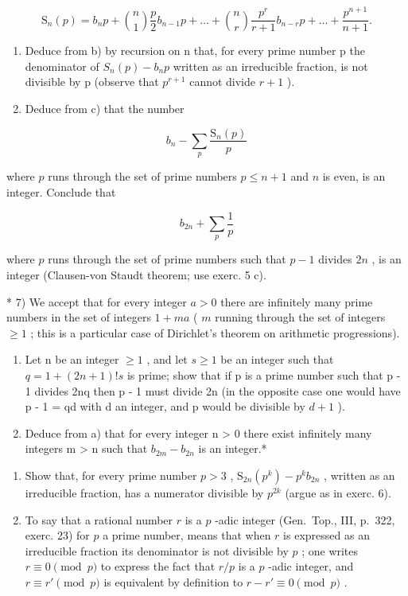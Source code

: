 \[
\mathrm{S} _ {n} (p) = b _ {n} p + \binom {n} {1} \frac {p}{2} b _ {n - 1} p + \dots + \binom {n} {r} \frac {p ^ {r}}{r + 1} b _ {n - r} p + \dots + \frac {p ^ {n + 1}}{n + 1}.
\]

\begin{enumerate}
\def\labelenumi{\alph{enumi})}
\setcounter{enumi}{2}
\item
  Deduce from b) by recursion on n that, for every prime number p the denominator of \(S_{n}(p) - b_{n}p\) written as an irreducible fraction, is not divisible by p (observe that \(p^{r+1}\) cannot divide \(r + 1\) ).
\item
  Deduce from c) that the number
\end{enumerate}

\[
b _ {n} - \sum_ {p} \frac {\mathrm{S} _ {n} (p)}{p}
\]

where \(p\) runs through the set of prime numbers \(p \leqslant n + 1\) and \(n\) is even, is an integer. Conclude that

\[
b _ {2 n} + \sum_ {p} \frac {1}{p}
\]

where \(p\) runs through the set of prime numbers such that \(p - 1\) divides \(2n\) , is an integer (Clausen-von Staudt theorem; use exerc. 5 c).

* 7) We accept that for every integer \(a > 0\) there are infinitely many prime numbers in the set of integers \(1 + ma\) ( \(m\) running through the set of integers \(\geqslant 1\) ; this is a particular case of Dirichlet's theorem on arithmetic progressions).

\begin{enumerate}
\def\labelenumi{\alph{enumi})}
\item
  Let n be an integer \(\geqslant 1\) , and let \(s \geqslant 1\) be an integer such that \(q = 1 + (2n + 1)!s\) is prime; show that if p is a prime number such that p - 1 divides 2nq then p - 1 must divide 2n (in the opposite case one would have p - 1 = qd with d an integer, and p would be divisible by \(d + 1\) ).
\item
  Deduce from a) that for every integer n \textgreater{} 0 there exist infinitely many integers m \textgreater{} n such that \(b_{2m} - b_{2n}\) is an integer.*
\end{enumerate}

\begin{enumerate}
\def\labelenumi{\arabic{enumi})}
\setcounter{enumi}{7}
\item
  Show that, for every prime number \(p > 3\) , \(\mathrm{S}_{2n}(p^k) - p^k b_{2n}\) , written as an irreducible fraction, has a numerator divisible by \(p^{2k}\) (argue as in exerc. 6).
\item
  To say that a rational number \(r\) is a \(p\) -adic integer (Gen.~Top., III, p.~322, exerc. 23) for \(p\) a prime number, means that when \(r\) is expressed as an irreducible fraction its denominator is not divisible by \(p\) ; one writes \(r \equiv 0 \pmod{p}\) to express the fact that \(r/p\) is a \(p\) -adic integer, and \(r \equiv r' \pmod{p}\) is equivalent by definition to \(r - r' \equiv 0 \pmod{p}\) .
\end{enumerate}

